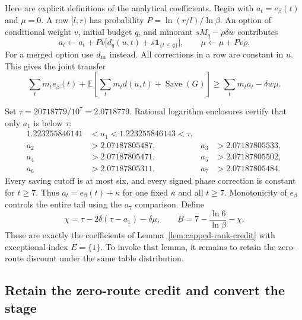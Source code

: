 Here are explicit definitions of the analytical coefficients. Begin
with $a_t=e_\beta(t)$ and $\mu=0$. A row $[l,r)$ has probability
$P=\ln(r/l)/\ln\beta$. An option of conditional weight $v$, initial
budget $q$, and minorant $sM_q-\rho\delta w$ contributes
\begin{equation}\label{eq:first-phase-coefficients}
 a_t\gets a_t+Pv\bigl[d_q(u,t)+s\mathbf1_{\{t\le q\}}\bigr],
 \qquad \mu\gets\mu+Pv\rho.
\end{equation}
For a merged option use $d_{\rm m}$ instead. All corrections in a
row are constant in $u$. This gives the joint transfer
\[
 \sum_t m_t e_\beta(t)+
 \mathbb E\left[\sum_t m_t d(u,t)+\operatorname{Save}(G)\right]
 \ge\sum_t m_t a_t-\delta w\mu.
\]

Set $\tau=20718779/10^7=2.0718779$. Rational logarithm enclosures
certify that only $a_1$ is below $\tau$:
\begin{equation}\label{eq:first-phase-coefficient-certificate}
 \begin{aligned}
 1.223255846141&<a_1<1.223255846143<\tau,\\
 a_2&>2.07187805487,&a_3&>2.07187805533,\\
 a_4&>2.07187805471,&a_5&>2.07187805502,\\
 a_6&>2.07187805311,&a_7&>2.07187805484.
 \end{aligned}
\end{equation}
Every saving cutoff is at most six, and every signed phase correction
is constant for $t\ge7$. Thus $a_t=e_\beta(t)+\kappa$ for one fixed
$\kappa$ and all $t\ge7$. Monotonicity of $e_\beta$ controls the
entire tail using the $a_7$ comparison. Define
\begin{equation}\label{eq:first-phase-chi-B}
 \chi=\tau-2\delta(\tau-a_1)-\delta\mu,\qquad
 B=7-\frac{\ln6}{\ln\beta}-\chi.
\end{equation}
These are exactly the coefficients of
Lemma~\ref{lem:capped-rank-credit} with exceptional index $E=\{1\}$.
To invoke that lemma, it remains to retain the zero-route discount
under the same table distribution.

\subsection{Retain the zero-route credit and convert the stage}

